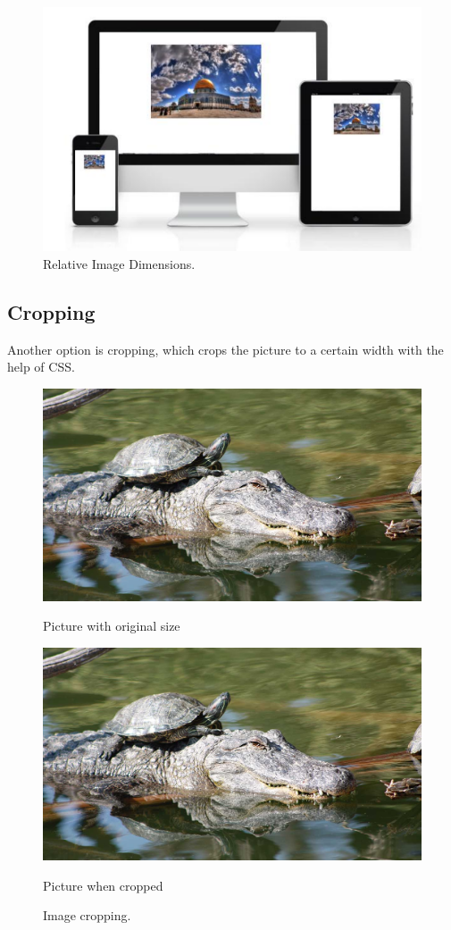 \begin{figure}[tp]
    \centering
    \includegraphics[keepaspectratio,width=\linewidth,height=\halfh]
    {images/relative.png}

    \caption[Relative Image Dimensions]{
        Relative Image Dimensions.
    }
    \label{fig:relative}
\end{figure}



\subsection{Cropping}

Another option is cropping, which crops the picture to a certain width
with the help of CSS.

\begin{figure}[tp]
    \centering
    {%
        \includegraphics[width=0.85\linewidth]
        {images/alig1.jpg}%
        \label{alig1}%
        \caption{Picture with original size}
    }
    \hfill
    {%
        \includegraphics[width=0.45\linewidth]
        {images/alig2.jpg}%
        \label{alig2}%
        \caption{Picture when cropped}
    }

    \caption[Image Cropping]
    {
        Image cropping.
    }
    \label{img_cropping}
\end{figure}

